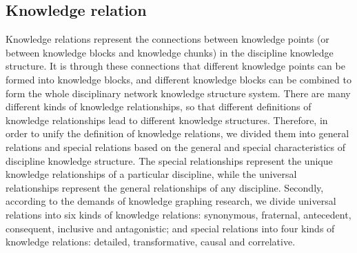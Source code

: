 \subsection{Knowledge relation}
Knowledge relations represent the connections between knowledge points (or between knowledge blocks and knowledge chunks) in the discipline knowledge structure\cite{wang2017knowledge}. It is through these connections that different knowledge points can be formed into knowledge blocks, and different knowledge blocks can be combined to form the whole disciplinary network knowledge structure system. There are many different kinds of knowledge relationships, so that different definitions of knowledge relationships lead to different knowledge structures. Therefore, in order to unify the definition of knowledge relations, we divided them into general relations and special relations based on the general and special characteristics of discipline knowledge structure. The special relationships represent the unique knowledge relationships of a particular discipline, while the universal relationships represent the general relationships of any discipline. Secondly, according to the demands of knowledge graphing research, we divide universal relations into six kinds of knowledge relations: synonymous, fraternal, antecedent, consequent, inclusive and antagonistic; and special relations into four kinds of knowledge relations: detailed, transformative, causal and correlative.
